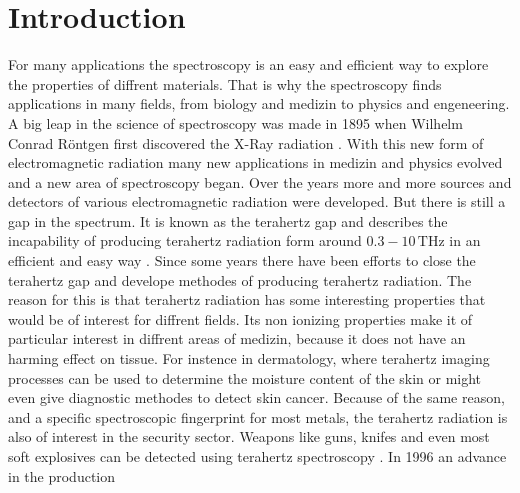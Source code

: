 \chapter{Introduction}
For many applications the spectroscopy is an easy and efficient way to explore the properties of diffrent materials.
That is why the spectroscopy finds applications in many fields, from biology and medizin to physics and engeneering.
A big leap in the science of spectroscopy was made in 1895 when Wilhelm Conrad Röntgen first discovered the X-Ray radiation \cite{roentgen}.
With this new form of electromagnetic radiation many new applications in medizin and physics evolved and a new area of spectroscopy began.
Over the years more and more sources and detectors of various electromagnetic radiation were developed.
But there is still a gap in the spectrum.
It is known as the terahertz gap and describes the incapability of producing terahertz radiation form around $0.3-10\,\si{\tera\hertz}$ in an efficient and easy way \cite[157--159]{THzgap_applications}.
Since some years there have been efforts to close the terahertz gap and develope methodes of producing terahertz radiation.
The reason for this is that terahertz radiation has some interesting properties that would be of interest for diffrent fields.
Its non ionizing properties make it of particular interest in diffrent areas of medizin, because it does not have an harming effect on tissue\cite[161--162]{THzgap_applications}.
For instence in dermatology, where terahertz imaging processes can be used to determine the moisture content of the skin or might even give diagnostic methodes to detect skin cancer\cite{terahertz_dermatology}. 
Because of the same reason, and a specific spectroscopic fingerprint for most metals, the terahertz radiation is also of interest in the security sector.
Weapons like guns, knifes and even most soft explosives can be detected using terahertz spectroscopy \cite[162]{THzgap_applications}\cite{thz_explosive_detec}.
In 1996 an advance in the production 

